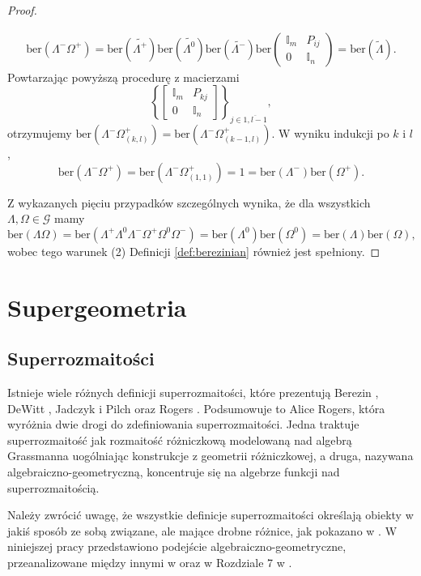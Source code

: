 \documentclass[11pt,a4paper]{report}
\theoremstyle{definition}
\newcommand{\ber}{\mathrm{ber}}
\newcommand{\I}{\mathbb{I}}
\begin{document}
\begin{proof}
\begin{enumerate}[1)]
\begin{enumerate}[5.1)]
\begin{equation*}
\begin{gathered}
 \ber(\Lambda^-\Omega^+) = \ber(\tilde{\Lambda^+}) \ber(\tilde{\Lambda^0}) \ber(\tilde{\Lambda^-}) \ber\left(\begin{matrix}
     \I_m & P_{ij} \\
     0 & \I_n 
     \end{matrix}\right)= \ber(\tilde{\Lambda}).
\end{gathered}
\end{equation*}
Powtarzając powyższą procedurę z macierzami $$\left\{ \begin{bmatrix}
     \I_m & P_{kj} \\
     0 & \I_n 
     \end{bmatrix} \right\}_{j \in \overline{1,l-1}},$$ otrzymujemy $\ber \left(\Lambda^-\Omega^+_{(k,l)} \right) = \ber \left(\Lambda^-\Omega^+_{(k-1,l)} \right)$. W wyniku indukcji po $k$ i $l$,
     $$\ber(\Lambda^-\Omega^+) = \ber \left( \Lambda^-\Omega^+_{(1,1)} \right) =1 =  \ber(\Lambda^-) \ber(\Omega^+).$$
\end{enumerate}
\end{enumerate}
Z wykazanych pięciu przypadków szczególnych wynika, że dla wszystkich $\Lambda, \Omega \in \mathcal{G}$ mamy
$$\ber(\Lambda \Omega) = \ber(\Lambda^{+} \Lambda^0 \Lambda^{-} \Omega^{+} \Omega^0 \Omega^{-}) = \ber(\Lambda^0) \ber(\Omega^0) = \ber(\Lambda) \ber(\Omega),$$
wobec tego warunek (2) Definicji \ref{def:berezinian} również jest spełniony.
\end{proof} 

\chapter{Supergeometria}

\section{Superrozmaitości}

Istnieje wiele różnych definicji superrozmaitości, które prezentują Berezin \cite{berezin}, DeWitt \cite{dewitt}, Jadczyk i Pilch \cite{jadczyk} oraz Rogers \cite{rogers}. Podsumowuje to Alice Rogers, która wyróżnia dwie drogi do zdefiniowania superrozmaitości. Jedna traktuje superrozmaitość jak rozmaitość różniczkową modelowaną nad algebrą Grassmanna uogólniając konstrukcje z geometrii różniczkowej, a druga, nazywana algebraiczno-geometryczną, koncentruje się na algebrze funkcji nad superrozmaitością.

Należy zwrócić uwagę, że wszystkie definicje superrozmaitości określają obiekty w jakiś sposób ze sobą związane, ale mające drobne różnice, jak pokazano w \cite{bartocci}. W niniejszej pracy przedstawiono podejście algebraiczno-geometryczne, przeanalizowane między innymi w \cite{berezin, varadarajan} oraz w Rozdziale 7 w \cite{rogers}.
\end{document}
